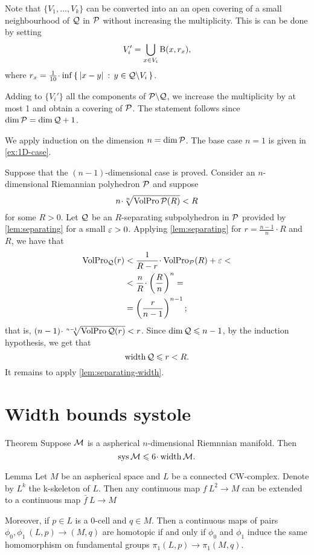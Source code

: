Note that $\{V_1,\dots,V_k\}$ can be converted into an an open covering of
a small neighbourhood of $\mathcal{Q}$ in $\mathcal{P}$ without increasing the multiplicity.
This is can be done by setting 
\[V_i'=\bigcup_{x\in V_i}\mathrm{B}{}(x,r_x),\]
where $r_x=\tfrac1{10}\cdot\inf\set{\dist{x}{y}{}}{y\in \spc{Q}\backslash V_i}$.

Adding to  $\{V_i'\}$ all the components of $\mathcal{P}\backslash \mathcal{Q}$,
we increase the multiplicity by at most 1 and obtain a covering of $\mathcal{P}$.
The statement follows since $\dim \spc{P}= \dim \spc{Q}\z+1$.
\qeds

We apply induction on the dimension $n=\operatorname{\rm dim}\nolimits\mathcal{P}$.
The base case $n=1$ is given in \ref{ex:1D-case}.

Suppose that the  $(n-1)$-dimensional case is proved.
Consider an $n$-dimensional Riemannian polyhedron $\mathcal{P}$ and suppose
\[n\cdot \sqrt[n]{\VolPro\spc{P}(R)}< R\]
for some $R>0$.
Let $\mathcal{Q}$ be an $R$-separating subpolyhedron in $\mathcal{P}$ provided by \ref{lem:separating} for a small $\varepsilon>0$.
Applying  \ref{lem:separating} for $r=\tfrac{n-1}n\cdot R$ and $R$, we have that 
\begin{align*}
\VolPro_\spc{Q}(r) &< \frac 1{R-r}\cdot \VolPro_\spc{P}(R)+\eps<
\\
&<\frac {n}{R}\cdot\left(\frac{R}{n}\right)^n=
\\
&=\left(\frac{r}{n-1}\right)^{n-1};
\end{align*}
that is, $(n-1)\cdot \sqrt[n-1]{\VolPro\spc{Q}(r)}< r$.
Since $\operatorname{\rm dim}\nolimits\mathcal{Q}\leqslant n-1$, by the induction hypothesis, we get that
\[\operatorname{\rm width}\nolimits\mathcal{Q}\leqslant r<R.\]
It remains to apply \ref{lem:separating-width}.
\qeds





\section{Width bounds systole}

\begin{thm}{Theorem}\label{thm:sys<width}
Suppose $\mathcal{M}$ is a aspherical $n$-dimensional Riemnnian manifold.
Then 
\[\sys\spc{M}\le 6 \cdot \width \spc{M}.\]
\end{thm}

\begin{thm}{Lemma}\label{lem:aspherical-homotopy}
Let $M$ be an aspherical space and $L$ be a connected CW-complex.
Denote by $L^k$ the k-skeleton of $L$.
Then any continuous map $f\:L^2\to M$ can be extended to a continuous map $\bar f\:L\to M$

Moreover, if $p\in L$ is a 0-cell and $q\in M$.
Then a continuous maps of pairs $\phi_0,\phi_1\:(L,p)\to(M,q)$ are homotopic if and only if $\phi_0$ and $\phi_1$ induce the same homomorphism on fundamental groups $\pi_1(L,p)\to\pi_1(M,q)$.
\end{thm}

